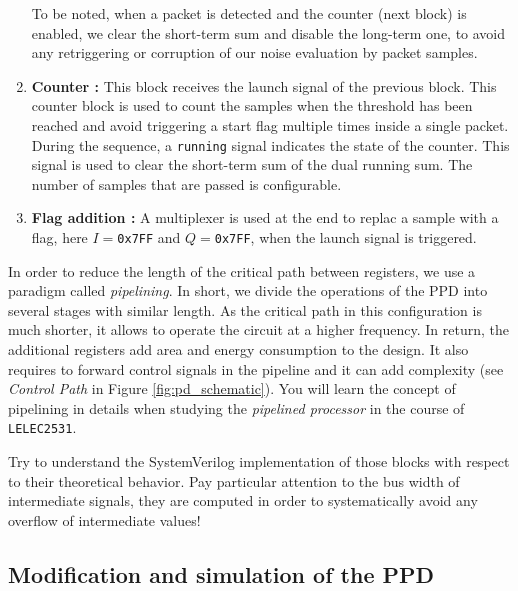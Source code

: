 \begin{enumerate}
    To be noted, when a packet is detected and the counter (next block) is enabled, we clear the short-term sum and disable the long-term one, to avoid any retriggering or corruption of our noise evaluation by packet samples.


    \item \textbf{Counter :} This block receives the launch signal of the previous block. This counter block is used to count the samples when the threshold has been reached and avoid triggering a start flag multiple times inside a single packet. During the sequence, a \texttt{running} signal indicates the state of the counter. This signal is used to clear the short-term sum of the dual running sum. The number of samples that are passed is configurable.

    \item \textbf{Flag addition :} A multiplexer is used at the end to replac a sample with a flag, here $I=$\texttt{0x7FF} and $Q=$\texttt{0x7FF}, when the launch signal is triggered.

\end{enumerate}


In order to reduce the length of the critical path between registers, we use a paradigm called \textit{pipelining}. In short, we divide the operations of the PPD into several stages with similar length. As the critical path in this configuration is much shorter, it allows to operate the circuit at a higher frequency. In return, the additional registers add area and energy consumption to the design. It also requires to forward control signals in the pipeline and it can add complexity (see \textit{Control Path} in Figure \ref{fig:pd_schematic}). You will learn the concept of pipelining in details when studying the \textit{pipelined processor} in the course of \texttt{LELEC2531}.

Try to understand the SystemVerilog implementation of those blocks with respect to their theoretical behavior. Pay particular attention to the bus width of intermediate signals, they are computed in order to systematically avoid any overflow of intermediate values!


\subsection{Modification and simulation of the PPD}


